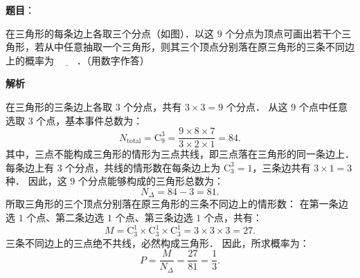\begin{answer}

\textbf{题目}：

在三角形的每条边上各取三个分点（如图）．以这 $9$ 个分点为顶点可画出若干个三角形，若从中任意抽取一个三角形，则其三个顶点分别落在原三角形的三条不同边上的概率为 $\underline{\hspace{2em}}$．（用数字作答）
\nopagebreak[4]
\begin{center}\end{center}
\nopagebreak[4]
\textbf{解析}

在三角形的三条边上各取 $3$ 个分点，共有 $3 \times 3 = 9$ 个分点．
从这 $9$ 个点中任意选取 $3$ 个点，基本事件总数为：
\nopagebreak[4]
\[
N_{\text{total}} = \mathrm{C}_9^3 = \dfrac{9 \times 8 \times 7}{3 \times 2 \times 1} = 84.
\]
其中，三点不能构成三角形的情形为三点共线，即三点落在三角形的同一条边上．
每条边上有 $3$ 个分点，共线的情形数在每条边上为 $\mathrm{C}_3^3 = 1$，三条边共有 $3 \times 1 = 3$ 种．
因此，这 $9$ 个分点能够构成的三角形总数为：
\nopagebreak[4]
\[
N_{\Delta} = 84 - 3 = 81.
\]
所取三角形的三个顶点分别落在原三角形的三条不同边上的情形数：
在第一条边选 $1$ 个点、第二条边选 $1$ 个点、第三条边选 $1$ 个点，共有：
\nopagebreak[4]
\[
M = \mathrm{C}_3^1 \times \mathrm{C}_3^1 \times \mathrm{C}_3^1 = 3 \times 3 \times 3 = 27.
\]
三条不同边上的三点绝不共线，必然构成三角形．
因此，所求概率为：
\nopagebreak[4]
\[
P = \dfrac{M}{N_{\Delta}} = \dfrac{27}{81} = \dfrac{1}{3}.
\]


\end{answer}
